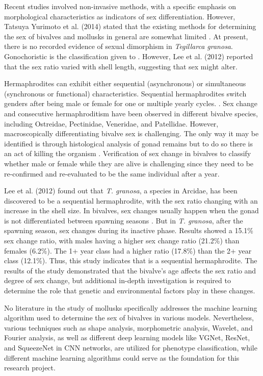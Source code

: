 Recent studies involved non-invasive methods, with a specific emphasis on morphological characteristics as indicators of sex differentiation. However, Tatsuya Yurimoto et al. (2014) stated that the existing methods for determining the sex of bivalves and mollusks in general are somewhat limited \cite{afiati2007}. At present, there is no recorded evidence of sexual dimorphism in \textit{Tegillarca granosa}. Gonochoristic is the classification given to \Tegillarcagranosa \cite{lee1997}. However, Lee et al. (2012) reported that the sex ratio varied with shell length, suggesting that sex might alter. 

Hermaphrodites can exhibit either sequential (asynchronous) or simultaneous (synchronous or functional) characteristics. Sequential hermaphrodites switch genders after being male or female for one or multiple yearly cycles. \cite{heller1993, gosling2004, collin2013}. Sex change and consecutive hermaphroditism have been observed in different bivalve species, including Ostreidae, Pectinidae, Veneridae, and Patellidae. However, macroscopically differentiating bivalve sex is challenging. The only way it may be identified is through histological analysis of gonad remains but to do so there is an act of killing the organism \cite{coe1943, gosling2004}. Verification of sex change in bivalves to classify whether male or female while they are alive is challenging since they need to be re-confirmed and re-evaluated to be the same individual after a year.

Lee et al. (2012) found out that \textit{T. granosa}, a species in Arcidae, has been discovered to be a sequential hermaphrodite, with the sex ratio changing with an increase in the shell size. In bivalves, sex changes usually happen when the gonad is not differentiated between spawning seasons \cite{thompson1996}. But in \textit{T. granosa}, after the spawning season, sex changes during its inactive phase. Results showed a 15.1\% sex change ratio, with males having a higher sex change ratio (21.2\%) than females (6.2\%). The 1+ year class had a higher ratio (17.8\%) than the 2+ year class (12.1\%). Thus, this study indicates that \Tgranosa is a sequential hermaphrodite. The results of the study demonstrated that the bivalve's age affects the sex ratio and degree of sex change, but additional in-depth investigation is required to determine the role that genetic and environmental factors play in these changes.

No literature in the study of mollusks specifically addresses the machine learning algorithm used to determine the sex of \Tgranosa bivalves in various models. Nevertheless, various techniques such as shape analysis, morphometric analysis, Wavelet, and Fourier analysis, as well as different deep learning models like VGNet, ResNet, and SqueezeNet in CNN networks, are utilized for phenotype classification, while different machine learning algorithms could serve as the foundation for this research project. 

